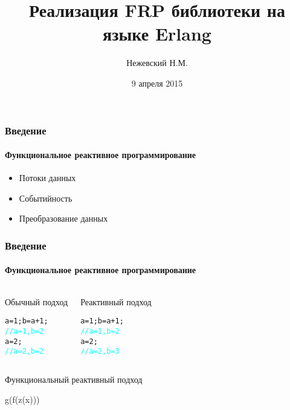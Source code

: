 \documentclass[10pt,pdf,hyperref={unicode},aspectratio=169]{beamer}
\begin{document}
\title{Реализация FRP библиотеки на языке Erlang}  


\author{Нежевский Н.М.}

\date{9 апреля 2015}

\begin{frame}
  \titlepage
\end{frame}

\begin{frame}
\frametitle{Введение}
\framesubtitle{Функциональное реактивное программирование}
\begin{itemize}
\item Потоки данных
\item Событийность
\item Преобразование данных
\end{itemize}
\end{frame}

\begin{frame}[fragile]
\frametitle{Введение}
\framesubtitle{Функциональное реактивное программирование}

\begin{columns}
 \begin{block}{Обычный подход}
 \begin{alltt}
  a = 1; b = a + 1;
  \textcolor{cyan}{// a = 1, b = 2}
  a = 2;
  \textcolor{cyan}{// a = 2, b = 2}
 \end{alltt}
 \end{block}

 \begin{block}{Реактивный подход}
 \begin{alltt}
  a = 1; b = a + 1;
  \textcolor{cyan}{// a = 1, b = 2}
  a = 2;
  \textcolor{cyan}{// a = 2, b = 3}
 \end{alltt}
 \end{block}
\end{columns}

 \begin{block}{Функциональный реактивный подход}
  \begin{center}
   g(f(z(x)))
  \end{center}
 \end{block}
\end{frame}
\end{document}
